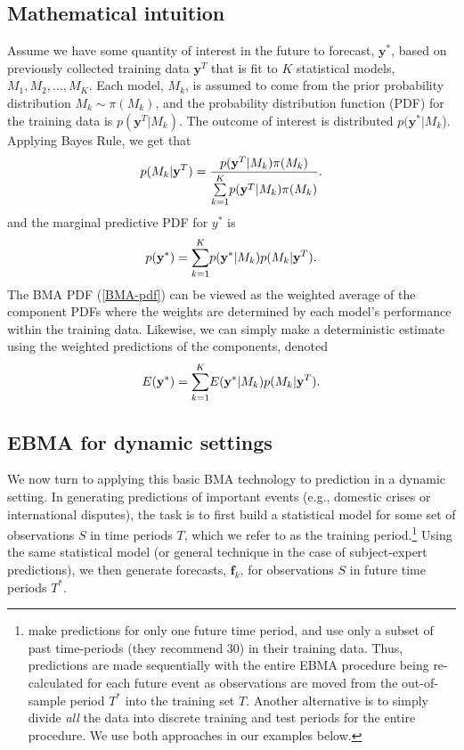 \documentclass[pdftex,12pt,fullpage,oneside]{amsart}
\begin{document}
\subsection{Mathematical intuition}
Assume we have some quantity of interest in the future to forecast,
$\mathbf{y}^*$, based on previously collected training data
$\mathbf{y}^T$ that is fit to $K$ statistical models, $M_1, M_2,
\ldots, M_K$. Each model, $M_k$, is assumed to come from the prior
probability distribution $M_k\sim \pi(M_k)$, and the probability
distribution function (PDF) for the training data is
$p(\mathbf{y}^T|M_k)$. The outcome of interest is distributed
$p(\mathbf{y}^*|M_k$).  Applying Bayes Rule, we get that
\begin{equation} \small
p(M_k|\mathbf{y}^T) = \frac{p(\mathbf{y}^T|M_k)\pi(M_k)}{\underset{k=1}{\overset{K}{\sum}}p(\mathbf{y}^T|M_k)\pi(M_k)}.
\end{equation}
\noindent and the marginal predictive PDF for $y^*$ is
\begin{equation}
\label{BMA-pdf}
\small
p(\mathbf{y}^*) = \underset{k=1}{\overset{K}{\sum}} p(\mathbf{y}^*|M_k)p(M_k|\mathbf{y}^T).
\end{equation}
The BMA PDF (\ref{BMA-pdf}) can be viewed as the weighted average of
the component PDFs where the weights are determined by each model's
performance within the training data.  Likewise, we can simply make a
deterministic estimate using the weighted predictions of the
components, denoted
\begin{equation} \small
E(\mathbf{y}^*) = \underset{k=1}{\overset{K}{\sum}} E(\mathbf{y}^*|M_k)p(M_k|\mathbf{y}^T).
\end{equation}

\subsection{EBMA for dynamic settings}

We now turn to applying this basic BMA technology to prediction in a
dynamic setting.  In generating predictions of important events (e.g.,
domestic crises or international disputes), the task is to first build
a statistical model for some set of observations $S$ in time periods
$T$, which we refer to as the training
period.\footnote{\citet{Sloughter:2007} make predictions for only one
  future time period, and use only a subset of past time-periods (they
  recommend 30) in their training data. Thus, predictions are made
  sequentially with the entire EBMA procedure being re-calculated for
  each future event as observations are moved from the out-of-sample
  period $T^*$ into the training set $T$. Another alternative is to
  simply divide \textit{all} the data into discrete training and test
  periods for the entire procedure.  We use both approaches in our
  examples below.}  Using the same statistical model (or general
technique in the case of subject-expert predictions), we then generate
forecasts, $\mathbf{f}_k$, for observations $S$ in future time periods
$T^*$.
\end{document}
